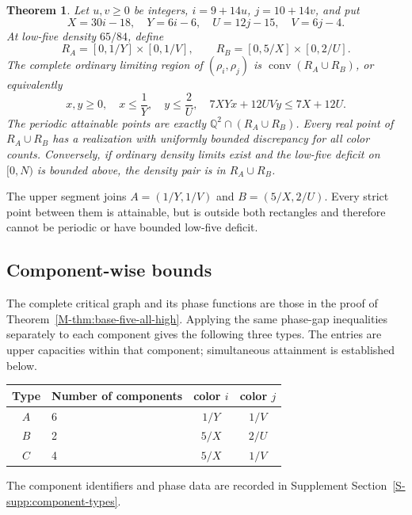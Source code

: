 \documentclass[11pt,reqno]{amsart}
\theoremstyle{plain}
\newtheorem{theorem}{Theorem}
\theoremstyle{plain}
\theoremstyle{plain}
\begin{document}
\begin{theorem}\label{M-thm:infinite-pair-regions}
Let $u,v\ge0$ be integers, $i=9+14u$, $j=10+14v$, and put
\[
 X=30i-18,\quad Y=6i-6,\quad U=12j-15,\quad V=6j-4.
\]
At low-five density $65/84$, define
\[
 R_A=[0,1/Y]\times[0,1/V],\qquad
 R_B=[0,5/X]\times[0,2/U].
\]
The complete ordinary limiting region of $(\rho_i,\rho_j)$ is
$\operatorname{conv}(R_A\cup R_B)$, or equivalently
\begin{equation}\label{M-eq:infinite-pair-region}
 x,y\ge0,\quad x\le\frac1Y,\quad y\le\frac2U,\quad
 7XYx+12UVy\le7X+12U.
\end{equation}
The periodic attainable points are exactly
$\mathbb Q^2\cap(R_A\cup R_B)$. Every real point of $R_A\cup R_B$
has a realization with uniformly bounded discrepancy for all color
counts. Conversely, if ordinary density limits exist and the low-five
deficit on $[0,N)$ is bounded above, the density pair is in
$R_A\cup R_B$.
\end{theorem}

The upper segment joins $A=(1/Y,1/V)$ and $B=(5/X,2/U)$. Every strict
point between them is attainable, but is outside both rectangles and
therefore cannot be periodic or have bounded low-five deficit. 

\subsection{Component-wise bounds}

The complete critical graph and its phase functions are those in the
proof of Theorem~\ref{M-thm:base-five-all-high}. Applying the same
phase-gap inequalities separately to each component gives the following
three types. The entries are upper capacities within that component;
simultaneous attainment is established below.
\begin{center}\small
\begin{tabular}{clcc}
\toprule
Type & Number of components & color $i$ & color $j$\\\midrule
$A$ & 6 & $1/Y$ & $1/V$\\
$B$ & 2 & $5/X$ & $2/U$\\
$C$ & 4 & $5/X$ & $1/V$\\\bottomrule
\end{tabular}
\end{center}
The component identifiers and phase data are recorded in Supplement
Section~\ref*{S-supp:component-types}.
\end{document}
